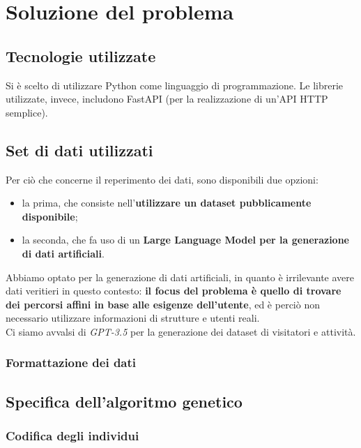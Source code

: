 \documentclass{CSUniSchoolLabReport}
\begin{document}
\section{Soluzione del problema}
\subsection{Tecnologie utilizzate}

Si è scelto di utilizzare Python come linguaggio di programmazione. Le librerie utilizzate, invece, includono FastAPI (per la realizzazione di un'API HTTP semplice).

\subsection{Set di dati utilizzati}

Per ciò che concerne il reperimento dei dati, sono disponibili due opzioni:

\begin{itemize}
    \item la prima, che consiste nell'\textbf{utilizzare un dataset pubblicamente disponibile};
    \item la seconda, che fa uso di un \textbf{Large Language Model per la generazione di dati artificiali}.
\end{itemize}

Abbiamo optato per la generazione di dati artificiali, in quanto è irrilevante avere dati veritieri in questo contesto: \textbf{il focus del problema è quello di trovare dei percorsi affini in base alle esigenze dell'utente}, ed è perciò non necessario utilizzare informazioni di strutture e utenti reali. \\
Ci siamo avvalsi di \textit{GPT-3.5} per la generazione dei dataset di visitatori e attività.

\subsubsection{Formattazione dei dati}

\subsection{Specifica dell'algoritmo genetico}

\subsubsection{Codifica degli individui}
\end{document}
